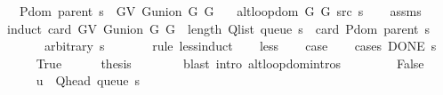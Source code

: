 \begin{isabellebody}
\ \ \ {\isachardoublequoteopen}P{\isachardot}{\kern0pt}dom\ {\isacharparenleft}{\kern0pt}parent\ s{\isacharparenright}{\kern0pt}\ {\isasymsubseteq}\ G{\isachardot}{\kern0pt}V\ {\isacharparenleft}{\kern0pt}G{\isachardot}{\kern0pt}union\ G{}\ G{}{\isacharparenright}{\kern0pt}{\isachardoublequoteclose}\isanewline
\ \ \ {\isachardoublequoteopen}alt{\isacharunderscore}{\kern0pt}loop{\isacharunderscore}{\kern0pt}dom\ {\isacharparenleft}{\kern0pt}G{}{\isacharcomma}{\kern0pt}\ G{}{\isacharcomma}{\kern0pt}\ src{\isacharcomma}{\kern0pt}\ s{\isacharparenright}{\kern0pt}{\isachardoublequoteclose}\isanewline
%
\isadelimproof
\ \ %
\endisadelimproof
%
\isatagproof
{}\isamarkupfalse%
\ assms\isanewline
{}\isamarkupfalse%
\ {\isacharparenleft}{\kern0pt}induct\ {\isachardoublequoteopen}card\ {\isacharparenleft}{\kern0pt}G{\isachardot}{\kern0pt}V\ {\isacharparenleft}{\kern0pt}G{\isachardot}{\kern0pt}union\ G{}\ G{}{\isacharparenright}{\kern0pt}{\isacharparenright}{\kern0pt}\ {\isacharplus}{\kern0pt}\ length\ {\isacharparenleft}{\kern0pt}Q{\isacharunderscore}{\kern0pt}list\ {\isacharparenleft}{\kern0pt}queue\ s{\isacharparenright}{\kern0pt}{\isacharparenright}{\kern0pt}\ {\isacharminus}{\kern0pt}\ card\ {\isacharparenleft}{\kern0pt}P{\isachardot}{\kern0pt}dom\ {\isacharparenleft}{\kern0pt}parent\ s{\isacharparenright}{\kern0pt}{\isacharparenright}{\kern0pt}{\isachardoublequoteclose}\isanewline
\ \ \ \ \ \ \ arbitrary{\isacharcolon}{\kern0pt}\ s\isanewline
\ \ \ \ \ \ \ rule{\isacharcolon}{\kern0pt}\ less{\isacharunderscore}{\kern0pt}induct{\isacharparenright}{\kern0pt}\isanewline
\ \ \isamarkupfalse%
\ less\isanewline
\ \ \isamarkupfalse%
\ {\isacharquery}{\kern0pt}case\isanewline
\ \ \isamarkupfalse%
\ {\isacharparenleft}{\kern0pt}cases\ {\isachardoublequoteopen}DONE\ s{\isachardoublequoteclose}{\isacharparenright}{\kern0pt}\isanewline
\ \ \ \ \isamarkupfalse%
\ True\isanewline
\ \ \ \ \isamarkupfalse%
\ {\isacharquery}{\kern0pt}thesis\isanewline
\ \ \ \ \ \ \isamarkupfalse%
\ {\isacharparenleft}{\kern0pt}blast\ intro{\isacharcolon}{\kern0pt}\ alt{\isacharunderscore}{\kern0pt}loop{\isachardot}{\kern0pt}domintros{\isacharparenright}{\kern0pt}\isanewline
\ \ \isamarkupfalse%
\isanewline
\ \ \ \ \isamarkupfalse%
\ False\isanewline
\ \ \ \ \isamarkupfalse%
\ {\isacharquery}{\kern0pt}u\ {\isacharequal}{\kern0pt}\ {\isachardoublequoteopen}Q{\isacharunderscore}{\kern0pt}head\ {\isacharparenleft}{\kern0pt}queue\ s{\isacharparenright}{\kern0pt}{\isachardoublequoteclose}\isanewline

\end{isabellebody}
